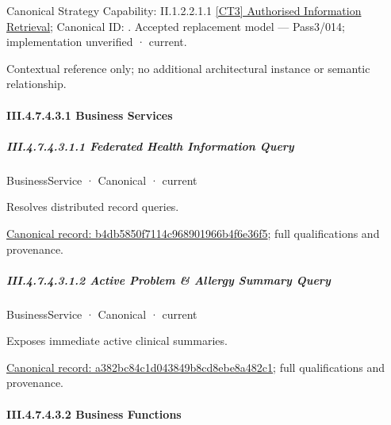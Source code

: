 {\small Canonical Strategy Capability: II.1.2.2.1.1 \hyperref[element:2c8a8c2de8a947478e06212a90ff066f]{[CT3] Authorised Information Retrieval}; Canonical ID: \texttt{}. Accepted replacement model — Pass3/014; implementation unverified · current.}\par
Contextual reference only; no additional architectural instance or semantic relationship.\par
\paragraph*{III.4.7.4.3.1 Business Services}
\label{navigation:III.4.7.4.3.1}

\subparagraph*{III.4.7.4.3.1.1 Federated Health Information Query}
\label{navigation:III.4.7.4.3.1.1}

\label{element:b4db5850f7114c968901966b4f6e36f5}
{\small BusinessService · Canonical · current}\par

Resolves distributed record queries.


{\footnotesize \href{../../../../continuum/business/business-service/b4db5850f7114c968901966b4f6e36f5.md}{Canonical record: b4db5850f7114c968901966b4f6e36f5}; full qualifications and provenance.}\par
\subparagraph*{III.4.7.4.3.1.2 Active Problem \& Allergy Summary Query}
\label{navigation:III.4.7.4.3.1.2}

\label{element:a382bc84c1d043849b8cd8ebe8a482c1}
{\small BusinessService · Canonical · current}\par

Exposes immediate active clinical summaries.


{\footnotesize \href{../../../../continuum/business/business-service/a382bc84c1d043849b8cd8ebe8a482c1.md}{Canonical record: a382bc84c1d043849b8cd8ebe8a482c1}; full qualifications and provenance.}\par
\paragraph*{III.4.7.4.3.2 Business Functions}
\label{navigation:III.4.7.4.3.2}

